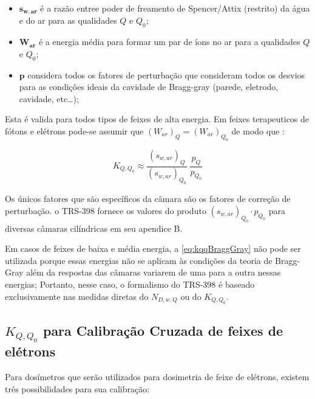 \documentclass[11pt,a4paper]{article}
\newcounter{exemplo}
\begin{document}
			\begin{exemplo}[onde:]
				\begin{itemize}[label=\textcolor{CarnationPink}{$\star$}]
					\item \textbf{\textcolor{CarnationPink}{$\mathbf{s_{w,ar}}$}} é a razão entree poder de freamento de Spencer/Attix (restrito) da água e do ar para as qualidades $Q$ e $Q_0$;
					\item  \textbf{\textcolor{CarnationPink}{$\mathbf{W_{ar}}$}} é a energia média para formar um par de íons no ar para a qualidades $Q$ e $Q_0$;
					\item \textbf{\textcolor{CarnationPink}{$\mathbf{p}$}} considera todos os fatores de perturbação que consideram todos os desvios para as condições ideais da cavidade de Bragg-gray (parede, eletrodo, cavidade, etc\dots);
				\end{itemize}
			\end{exemplo}

		Esta  é valida para todos tipos de feixes de alta energia. Em feixes terapeuticos de fótons e elétrons pode-se assumir que $(W_{ar})_{Q} = (W_{ar})_{Q_0}$ de modo que :
		
			\begin{equation}
				K_{Q,Q_0} \approx  \frac{(s_{w,ar})_Q}{(s_{w,ar})_{Q_0}} \; \frac{p_{Q}}{p_{Q_0}}
				\label{eq:kqqAproximacao}
			\end{equation}

		Os únicos fatores que são específicos da câmara são os fatores de correção de perturbação. o TRS-398 fornece os valores do produto $(s_{w,ar})_{Q_0} \cdot p_{Q_0}$ para diversas câmaras cilíndricas em seu apendice B.

		Em casos de feixes de baixa e média energia, a \ref{eq:kqqBraggGray} não pode ser utilizada porque essas energias não se aplicam às condições da teoria de Bragg-Gray além da respostas das câmaras variarem de uma para a outra nessas energias; Portanto, nesse caso, o formalismo do TRS-398 é baseado exclusivamente nas medidas diretas do $N_{D,w,Q}$ ou do $K_{Q,Q_0}$.

	\subsection{$K_{Q,Q_0}$ para Calibração Cruzada de feixes de elétrons}

		Para dosímetros que serão utilizados para dosimetria de feixe de elétrons, existem três possibilidades para sua calibração:
\end{document}
